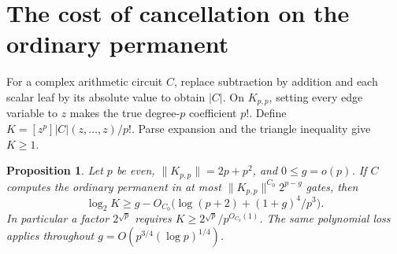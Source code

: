 \documentclass[11pt]{article}
\newtheorem{proposition}[theorem]{Proposition}
\theoremstyle{definition}
\begin{document}
\section{The cost of cancellation on the ordinary permanent}\label{sec:cancellation}

For a complex arithmetic circuit \(C\), replace subtraction by addition and each scalar leaf by its absolute value to obtain \(|C|\). On \(K_{p,p}\), setting every edge variable to \(z\) makes the true degree-\(p\) coefficient \(p!\). Define \(K=[z^p]|C|(z,\ldots,z)/p!\). Parse expansion and the triangle inequality give \(K\ge1\).

\begin{proposition}\label{prop:cancellation}
Let \(p\) be even, \(\|K_{p,p}\|=2p+p^2\), and \(0\le g=o(p)\). If \(C\) computes the ordinary permanent in at most \(\|K_{p,p}\|^{C_0}2^{p-g}\) gates, then
\[
             \log_2 K\ge g-O_{C_0}\bigl(\log(p+2)+(1+g)^4/p^3\bigr).
\]
In particular a factor \(2^{\sqrt p}\) requires \(K\ge 2^{\sqrt p}/p^{O_{C_0}(1)}\). The same polynomial loss applies throughout \(g=O(p^{3/4}(\log p)^{1/4})\).
\end{proposition}
\end{document}
